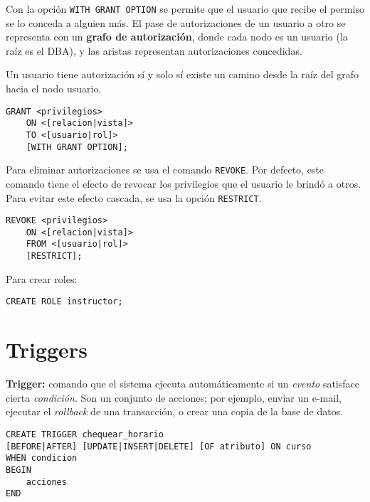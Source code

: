 \documentclass[a4paper, twoside]{article}
\begin{document}
Con la opción \texttt{WITH GRANT OPTION} se permite que el usuario que recibe el permiso se lo conceda a alguien más. El pase de autorizaciones de un usuario a otro se representa con un \textbf{grafo de autorización}, donde cada nodo es un usuario (la raíz es el DBA), y las aristas representan autorizaciones concedidas.

Un usuario tiene autorización sí y solo sí existe un camino desde la raíz del grafo hacia el nodo usuario.

\begin{lstlisting}
GRANT <privilegios>
	ON <[relacion|vista]>
	TO <[usuario|rol]>
	[WITH GRANT OPTION];
\end{lstlisting}

Para eliminar autorizaciones se usa el comando \texttt{REVOKE}. Por defecto, este comando tiene el efecto de revocar los privilegios que el usuario le brindó a otros. Para evitar este efecto cascada, se usa la opción \texttt{RESTRICT}.

\begin{lstlisting}
REVOKE <privilegios>
	ON <[relacion|vista]>
	FROM <[usuario|rol]>
	[RESTRICT];
\end{lstlisting}

Para crear roles:

\begin{lstlisting}
CREATE ROLE instructor;
\end{lstlisting}

\section{Triggers}
\textbf{Trigger:} comando que el sistema ejecuta automáticamente si un \emph{evento} satisface cierta \emph{condición}. Son un conjunto de acciones; por ejemplo, enviar un e-mail, ejecutar el \emph{rollback} de una transacción, o crear una copia de la base de datos.

\begin{lstlisting}
CREATE TRIGGER chequear_horario
[BEFORE|AFTER] [UPDATE|INSERT|DELETE] [OF atributo] ON curso
WHEN condicion
BEGIN
	acciones
END
\end{lstlisting}

\newpage
\end{document}
